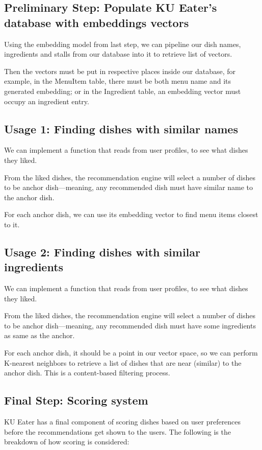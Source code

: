 \subsection{Preliminary Step: Populate KU Eater's database with embeddings vectors}
Using the embedding model from last step, we can pipeline our dish names,
ingredients and stalls from our database into it to retrieve list of vectors.

Then the vectors must be put in respective places inside our database, for example,
in the MenuItem table, there must be both menu name and its generated embedding;
or in the Ingredient table, an embedding vector must occupy an ingredient entry.

\subsection{Usage 1: Finding dishes with similar names}
We can implement a function that reads from user profiles, to see what dishes they liked.

From the liked dishes, the recommendation engine will select a number of dishes
to be anchor dish---meaning, any recommended dish must have similar name to the anchor dish.

For each anchor dish, we can use its embedding vector to
find menu items closest to it.

\subsection{Usage 2: Finding dishes with similar ingredients}
We can implement a function that reads from user profiles, to see what dishes they liked.

From the liked dishes, the recommendation engine will select a number of dishes
to be anchor dish---meaning, any recommended dish must have some ingredients as same as the anchor.

For each anchor dish, it should be a point in our vector space, so we can perform
K-nearest neighbors to retrieve a list of dishes that are near (similar) to the anchor dish.
This is a content-based filtering process.

\subsection{Final Step: Scoring system}
KU Eater has a final component of scoring dishes based on user preferences
before the recommendations get shown to the users. The following is the breakdown of
how scoring is considered:

